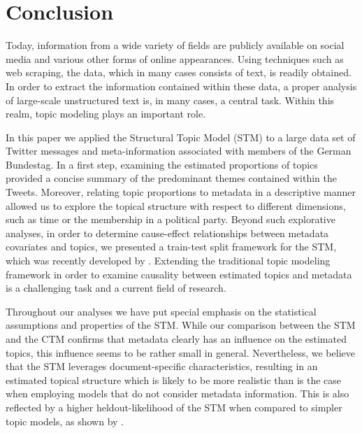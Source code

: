 \section{Conclusion}
\label{Conclusion}

Today, information from a wide variety of fields are publicly available on social media and various other forms of online appearances. Using techniques such as web scraping, the data, which in many cases consists of text, is readily obtained. In order to extract the information contained within these data, a proper analysis of large-scale unstructured text is, in many cases, a central task. Within this realm, topic modeling plays an important role.

In this paper we applied the Structural Topic Model (STM) to a large data set of Twitter messages and meta-information associated with members of the German Bundestag. In a first step, examining the estimated proportions of topics provided a concise summary of the predominant themes contained within the Tweets. Moreover, relating topic proportions to metadata in a descriptive manner allowed us to explore the topical structure with respect to different dimensions, such as time or the membership in a political party. Beyond such explorative analyses, in order to determine cause-effect relationships between metadata covariates and topics, we presented a train-test split framework for the STM, which was recently developed by \cite{egami2018make}. Extending the traditional topic modeling framework in order to examine causality between estimated topics and metadata is a challenging task and a current field of research. 

Throughout our analyses we have put special emphasis on the statistical assumptions and properties of the STM. While our comparison between the STM and the CTM confirms that metadata clearly has an influence on the estimated topics, this influence seems to be rather small in general. Nevertheless, we believe that the STM leverages document-specific characteristics, resulting in an estimated topical structure which is likely to be more realistic than is the case when employing models that do not consider metadata information. This is also reflected by a higher heldout-likelihood of the STM when compared to simpler topic models, as shown by \cite{roberts2016model}. 

